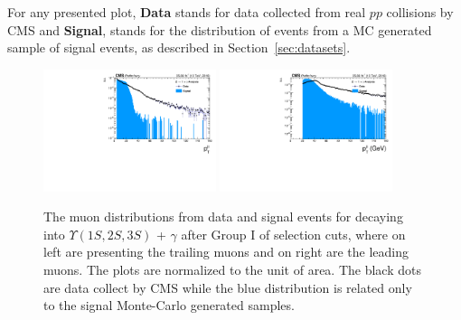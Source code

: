 For any presented plot, \textbf{Data} stands for data collected from real $pp$ collisions by CMS and \textbf{Signal}, stands for the distribution of events from a MC generated sample of signal events, as described in Section~\ref{sec:datasets}.

\begin{figure}[!htbp]
\begin{center}
\includegraphics[width=0.45\textwidth]{figures_and_tables/outputPlots/ZtoUpsilon_Cat0_ZZZZZ/au/data_x_mc/noKinCuts/h_noKin_TrailingMu_pt}\hspace*{1.cm}
\includegraphics[width=0.45\textwidth]{figures_and_tables/outputPlots/ZtoUpsilon_Cat0_ZZZZZ/au/data_x_mc/noKinCuts/h_noKin_LeadingMu_pt}
\end{center}\vspace*{-.5cm}
\caption{The \PT muon distributions from data and signal events for \Z decaying into $\Upsilon(1S,2S,3S)$ + $\gamma$ after Group I of selection cuts, where on left are presenting the trailing muons and on right are the leading muons. The plots are normalized to the unit of area. The black dots are data collect by CMS while the blue distribution is related only to the signal Monte-Carlo generated samples.}
\label{fig:pTMuons_ZtoUpsilon_Cat0}
\end{figure}


